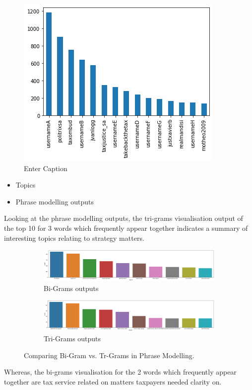 \begin{figure}
    \centering
    \includegraphics[width=0.1\linewidth]{usenames for second data.png}
    \caption{Enter Caption}
    \label{fig:enter-label}
\end{figure}

\begin{itemize}
    \item Topics 
\end{itemize}

\begin{itemize}
    \item Phrase modelling outputs
\end{itemize}


Looking at the phrase modelling outputs, the tri-grams visualisation output of the top 10 for 3 words which frequently appear together indicates a summary of interesting topics relating to strategy matters.

\begin{figure}
      \centering
	    \begin{subfigure}{0.1\linewidth}
		\includegraphics[width=\linewidth]{Bi-grams for second second user data.png}
		\caption{Bi-Grams outputs}
		\label{fig: Associated Bi-Grams Outputs}
	   \end{subfigure}
	   \begin{subfigure}{0.3\linewidth}
		\includegraphics[width=\linewidth]{Tri-gram second second user data.png}
		\caption{Tri-Grams outputs}
		\label{fig:Associated Tri-Gram Outputs}
	    \end{subfigure}
	   \vfill
	 \caption{Comparing Bi-Gram vs. Tr-Grams in Phrase Modelling.}
\end{figure}

Whereas, the bi-grams visualisation for the 2 words which frequently appear together are tax service related on matters taxpayers needed clarity on.

